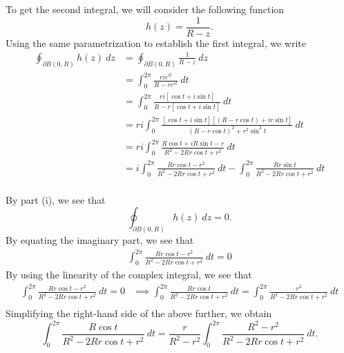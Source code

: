 \documentclass[a4paper]{article}
\begin{document}
\begin{solution}[b]
\begin{enumerate}
           To get the second integral, we will consider the following function
           \[  h(z) = \frac{ 1 }{ R - z  }. \]
           Using the same parametrization to establish the first integral, we write
           \begin{align*}
                 \oint_{  \partial B(0,R) }^{  } h(z) \ dz &= \oint_{ \partial B(0,R) }^{  } \frac{ 1  }{ R - z  }  \ dz    \\
                                                           &= \int_{ 0 }^{ 2 \pi } \frac{ ri e^{it  }  }{ R - r e^{it } }  \ dt \\
                                                           &= \int_{ 0 }^{ 2\pi  }  \frac{ ri [\cos t + i \sin t] }{ R - r[\cos t + i \sin t] }  \ dt \\
                                                           &= ri \int_{ 0  }^{ 2 \pi  } \frac{ [\cos t + i \sin t][ (R - r \cos t ) + ir \sin t ] }{ (R - r \cos t )^{2} + r^{2} \sin^{2} t  }   \ dt \\
                                                           &= ri \int_{ 0 }^{ 2 \pi  } \frac{ R \cos t + i R \sin t - r  }{ R^{2} - 2 R  r \cos t + r^{2} }  \ dt \\
                                                           &= i \int_{ 0 }^{ 2\pi  } \frac{ R r \cos t - r^{2} }{ R^{2} - 2Rr \cos t + r^{2} }  \ dt - \int_{ 0 }^{ 2 \pi  } \frac{ Rr \sin t  }{ R^{2} - 2 R r \cos t + r^{2} }  \ dt \\
           \end{align*}
    \end{enumerate}
    By part (i), we see that 
    \[  \oint_{ \partial B(0,R)  }^{  } h(z) \ dz = 0. \]
    By equating the imaginary part, we see that 
    \begin{align*}
        \int_{ 0 }^{ 2 \pi  }  \frac{ Rr \cos t - r^{2} }{ R^{2} - 2 R r \cos t + r^{2} }  \ dt = 0 
    \end{align*}
    By using the linearity of the complex integral, we see that
    \begin{align*}
        \int_{ 0 }^{ 2 \pi  } \frac{ Rr \cos t - r^{2}  }{ R^{2} - 2 R r \cos t + r^{2} }  \ dt = 0 &\implies \int_{ 0 }^{ 2 \pi  } \frac{ Rr \cos t  }{ R^{2} - 2Rr \cos t + r^{2} }  \ dt = \int_{ 0 }^{ 2 \pi  } \frac{ r^{2} }{ R^{2} - 2 R r \cos t + r^{2} }  \ dt \\
    \end{align*}
    Simplifying the right-hand side of the above further, we obtain
    \[  \int_{ 0 }^{ 2 \pi  } \frac{ R \cos t  }{ R^{2} - 2Rr \cos t + r^{2} }  \ dt = \frac{ r  }{ R^{2} - r^{2} } \int_{ 0 }^{ 2 \pi  } \frac{ R^{2} -r^{2} }{ R^{2} - 2 R r \cos t + r^{2} }  \ dt. \]

\end{solution}
\end{document}
